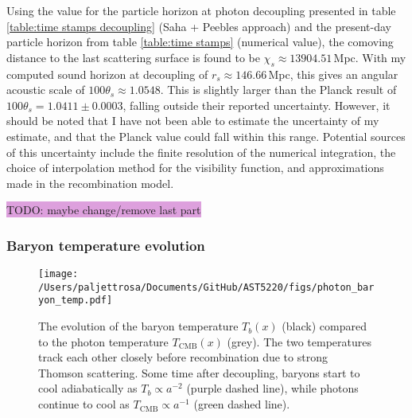 \documentclass{aa}
\numberwithin{equation}{section}
\numberwithin{table}{section}
\numberwithin{figure}{section}
\begin{document}
Using the value for the particle horizon at photon decoupling presented in table \ref{table:time stamps decoupling} (Saha + Peebles approach) and the present-day particle horizon from table \ref{table:time stamps} (numerical value), the comoving distance to the last scattering surface is found to be $\chi_{s} \approx 13904.51\,$Mpc. With my computed sound horizon at decoupling of $r_s \approx 146.66\,$Mpc, this gives an angular acoustic scale of $100\theta_{s} \approx 1.0548$. This is slightly larger than the Planck result of $100\theta_{s} = 1.0411\pm0.0003$, falling outside their reported uncertainty. However, it should be noted that I have not been able to estimate the uncertainty of my estimate, and that the Planck value could fall within this range. Potential sources of this uncertainty include the finite resolution of the numerical integration, the choice of interpolation method for the visibility function, and approximations made in the recombination model.

\colorbox{Plum}{TODO: maybe change/remove last part}



\subsubsection{Baryon temperature evolution}

\begin{figure}
  \centering
  \texttt{[image: /Users/paljettrosa/Documents/GitHub/AST5220/figs/photon\_baryon\_temp.pdf]}
  \caption{The evolution of the baryon temperature $T_b(x)$ (black) compared to the photon temperature $T_\text{CMB}(x)$ (grey). The two temperatures track each other closely before recombination due to strong Thomson scattering. Some time after decoupling, baryons start to cool adiabatically as $T_b \propto a^{-2}$ (purple dashed line), while photons continue to cool as $T_\text{CMB} \propto a^{-1}$ (green dashed line).}\label{fig:baryon temperature}
\end{figure}
\end{document}
